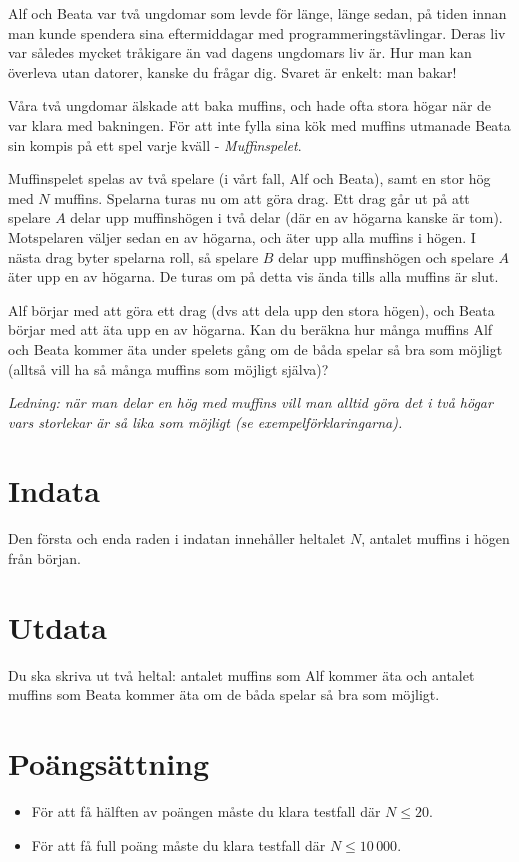 
Alf och Beata var två ungdomar som levde för länge, länge sedan, på tiden innan man kunde spendera sina eftermiddagar med programmeringstävlingar. Deras liv var således mycket tråkigare än vad dagens ungdomars liv är. Hur man kan överleva utan datorer, kanske du frågar dig. Svaret är enkelt: man bakar!

Våra två ungdomar älskade att baka muffins, och hade ofta stora högar när de var klara med bakningen. För att inte fylla sina kök med muffins utmanade Beata sin kompis på ett spel varje kväll - \emph{Muffinspelet}.

Muffinspelet spelas av två spelare (i vårt fall, Alf och Beata), samt en stor hög med $N$ muffins. Spelarna turas nu om att göra drag. Ett drag går ut på att spelare $A$ delar upp muffinshögen i två delar (där en av högarna kanske är tom). Motspelaren väljer sedan en av högarna, och äter upp alla muffins i högen. I nästa drag byter spelarna roll, så spelare $B$ delar upp muffinshögen och spelare $A$ äter upp en av högarna. De turas om på detta vis ända tills alla muffins är slut.

Alf börjar med att göra ett drag (dvs att dela upp den stora högen), och Beata börjar med att äta upp en av högarna. Kan du beräkna hur många muffins Alf och Beata kommer äta under spelets gång om de båda spelar så bra som möjligt (alltså vill ha så många muffins som möjligt själva)?

\emph{Ledning: när man delar en hög med muffins vill man alltid göra det i två högar vars storlekar är så lika som möjligt (se exempelförklaringarna).}

\section*{Indata}
Den första och enda raden i indatan innehåller heltalet $N$, antalet muffins i högen från början.

\section*{Utdata}
Du ska skriva ut två heltal: antalet muffins som Alf kommer äta och antalet muffins som Beata kommer äta om de båda spelar så bra som möjligt.

\section*{Poängsättning}
\begin{itemize}
	\item För att få hälften av poängen måste du klara testfall där $N \le 20$.
	\item För att få full poäng måste du klara testfall där $N \le 10\,000$.
\end{itemize}


